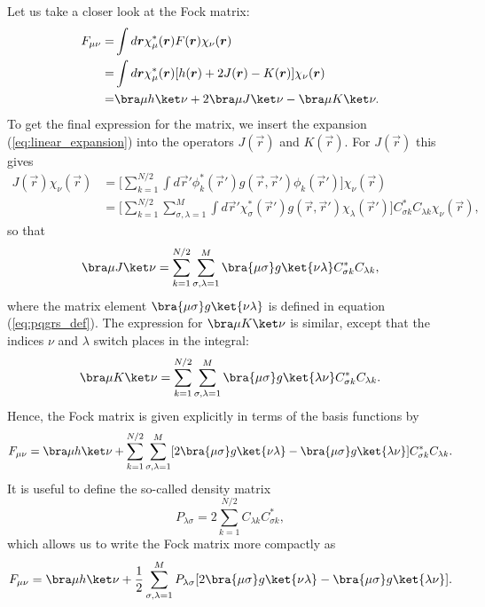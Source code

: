 Let us take a closer look at the Fock matrix:
\begin{equation}
 \begin{split}
  F_{\mu\nu} = & \int d\vec r \chi^*_\mu(\vec r) F(\vec r)\chi_\nu(\vec r)\\
                  = & \int d\vec r \chi^*_\mu(\vec r)[h(\vec r) + 2J(\vec r) - K(\vec r)]\chi_\nu(\vec r) \\
                  = & \bra\mu h\ket\nu + 2 \bra\mu J\ket\nu - \bra\mu K\ket\nu.
 \end{split}
\end{equation}
To get the final expression for the matrix, we insert the expansion (\ref{eq:linear_expansion}) into the operators $J(\vec r)$ and $K(\vec r)$.
For $J(\vec r)$ this gives
\begin{equation}
\begin{split}
 J(\vec r)\chi_\nu(\vec r) & = \Big[\sum_{k=1}^{N/2}\int d\vec r'\phi^*_k(\vec r')g(\vec r, \vec r')\phi_k(\vec r')\Big]\chi_\nu(\vec r) \\
                             & = \Big[\sum_{k=1}^{N/2}\sum_{\sigma,\lambda=1}^M\int d\vec r'\chi^*_\sigma(\vec r')g(\vec r, \vec r')\chi_\lambda(\vec r')\Big]C^*_{\sigma k}C_{\lambda k}\chi_\nu(\vec r),
\end{split}
\end{equation}
so that
\begin{equation}
 \bra\mu J\ket\nu = \sum_{k=1}^{N/2}\sum_{\sigma,\lambda=1}^M\bra{\mu\sigma}g\ket{\nu\lambda}C^*_{\sigma k}C_{\lambda k},
\end{equation}
where the matrix element $\bra{\mu\sigma}g\ket{\nu\lambda}$ is defined in equation (\ref{eq:pqgrs_def}).
The expression for $\bra\mu K\ket\nu$ is similar, except that the indices $\nu$ and $\lambda$ switch places in the integral:
\begin{equation}
 \bra\mu K\ket\nu = \sum_{k=1}^{N/2}\sum_{\sigma,\lambda=1}^M\bra{\mu\sigma}g\ket{\lambda\nu}C^*_{\sigma k}C_{\lambda k}.
\end{equation}
Hence, the Fock matrix is given explicitly in terms of the basis functions by
\begin{equation}
 F_{\mu\nu} = \bra\mu h\ket\nu + \sum_{k=1}^{N/2}\sum_{\sigma,\lambda=1}^M[2\bra{\mu\sigma}g\ket{\nu\lambda} - \bra{\mu\sigma}g\ket{\lambda\nu}]C^*_{\sigma k}C_{\lambda k}.
\end{equation}
It is useful to define the so-called density matrix
\begin{equation}
\label{eq:density_matrix}
 P_{\lambda\sigma} = 2\sum_{k=1}^{N/2}C_{\lambda k}C^*_{\sigma k},
\end{equation}
which allows us to write the Fock matrix more compactly as
\begin{equation}
\label{eq:Fock_matrix}
 F_{\mu\nu} = \bra\mu h\ket\nu + \frac{1}{2}\sum_{\sigma,\lambda=1}^M P_{\lambda\sigma}[2\bra{\mu\sigma}g\ket{\nu\lambda} - \bra{\mu\sigma}g\ket{\lambda\nu}].
\end{equation}

